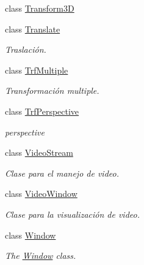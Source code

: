 \begin{DoxyCompactItemize}
\item 
class \hyperlink{class_i3_d_1_1_transform3_d}{Transform3D}
\item 
class \hyperlink{class_i3_d_1_1_translate}{Translate}
\begin{DoxyCompactList}\small\item\em Traslación. \end{DoxyCompactList}\item 
class \hyperlink{class_i3_d_1_1_trf_multiple}{Trf\+Multiple}
\begin{DoxyCompactList}\small\item\em Transformación multiple. \end{DoxyCompactList}\item 
class \hyperlink{class_i3_d_1_1_trf_perspective}{Trf\+Perspective}
\begin{DoxyCompactList}\small\item\em perspective \end{DoxyCompactList}\item 
class \hyperlink{class_i3_d_1_1_video_stream}{Video\+Stream}
\begin{DoxyCompactList}\small\item\em Clase para el manejo de video. \end{DoxyCompactList}\item 
class \hyperlink{class_i3_d_1_1_video_window}{Video\+Window}
\begin{DoxyCompactList}\small\item\em Clase para la visualización de video. \end{DoxyCompactList}\item 
class \hyperlink{class_i3_d_1_1_window}{Window}
\begin{DoxyCompactList}\small\item\em The \hyperlink{class_i3_d_1_1_window}{Window} class. \end{DoxyCompactList}\end{DoxyCompactItemize}
